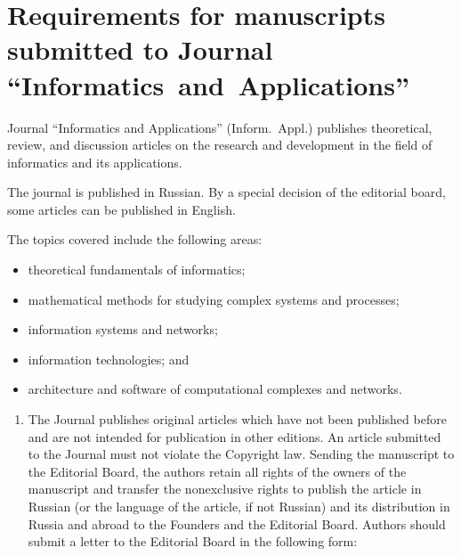 \vspace*{-60pt} 
{\small 
{ %

\section*{Requirements for manuscripts submitted to Journal 
``Informatics~and~Applications''}

\vspace*{12pt}

\thispagestyle{empty}

\noindent 
Journal ``Informatics and Applications'' (Inform.\ Appl.)
publishes theoretical, review, and discussion 
articles on the research and development in the 
field of informatics and its applications.


The journal is published in Russian. 
By a special decision of the editorial 
board, some articles can be published in English.


The topics covered include the following areas:
\begin{itemize}
               \item
     theoretical fundamentals of informatics; \\[-14pt]
\item
mathematical methods for studying complex systems and processes; \\[-14pt]
\item
information systems and networks;\\[-14pt]
\item
information technologies; and \\[-14pt]
\item
architecture and software of computational complexes and networks. \\[-14pt]
\end{itemize}

\noindent
\begin{enumerate}[1.]
\item The Journal publishes original articles which have not been published before and are not 
intended for publication in other editions. An article submitted to the Journal must not violate the 
Copyright law. Sending the manuscript to the Editorial Board, the authors retain all rights of the 
owners of the manuscript and transfer the nonexclusive rights to publish the article in Russian 
(or the language of the article, if not Russian) and its distribution in Russia and abroad to the 
Founders and the Editorial Board. Authors should submit a letter to the Editorial Board in the 
following form:


\end{enumerate}}}
